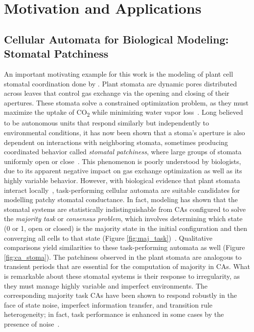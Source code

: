 \documentclass[a4paper,11pt]{report}
\begin{document}
\section{Motivation and Applications}
\label{sec:Motiv}
\subsection{Cellular Automata for Biological Modeling: Stomatal Patchiness}
\label{subsec:Stoma}
An important motivating example for this work is the modeling of plant cell stomatal coordination done by \citeauthor{pe04}. Plant stomata are dynamic pores distributed across leaves that control gas exchange via the opening and closing of their apertures. These stomata solve a constrained optimization problem, as they must maximize the uptake of CO\textsubscript{2} while minimizing water vapor loss~\cite{mo07,we11}. Long believed to be autonomous units that respond similarly but independently to environmental conditions, it has now been shown that a stoma's aperture is also dependent on interactions with neighboring stomata, sometimes producing coordinated behavior called \textit{stomatal patchiness}, where large groups of stomata uniformly open or close~\cite{pe04}. This phenomenon is poorly understood by biologists, due to its apparent negative impact on gas exchange optimization as well as its highly variable behavior. However, with biological evidence that plant stomata interact locally~\cite{pe04}, task-performing cellular automata are suitable candidates for modelling patchy stomatal conductance. In fact, modeling has shown that the stomatal systems are statistically indistinguishable from CAs configured to solve the \textit{majority task} or \textit{consensus problem}, which involves determining which state (0 or 1, open or closed) is the majority state in the initial configuration and then converging all cells to that state (Figure \ref{fig:maj_task})~\cite{gr15}. Qualitative comparisons yield similarities to these task-performing automata as well (Figure \ref{fig:ca_stoma}). The patchiness observed in the plant stomata are analogous to transient periods that are essential for the computation of majority in CAs. What is remarkable about these stomatal systems is their response to irregularity, as they must manage highly variable and imperfect environments. The corresponding majority task CAs have been shown to respond robustly in the face of state noise, imperfect information transfer, and transition rule heterogeneity; in fact, task performance is enhanced in some cases by the presence of noise~\cite{me07}.
\end{document}
